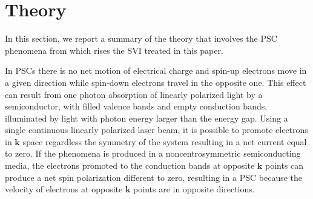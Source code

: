 \documentclass[prb,11pt,tightenlines,twocolumn,aps]{revtex4-1}
\begin{document}
\section{Theory} %
\label{sec:theory}




In this section, we report a summary of the theory that involves the PSC
phenomena from which rises the SVI treated in this paper.
 
In PSCs there is no net motion of electrical charge and spin-up electrons move
in a given direction while spin-down electrons travel in the opposite one.
This effect can result from one photon absorption of linearly polarized light
by a semiconductor, with filled valence bands and empty conduction bands,
illuminated by light with photon energy larger than the energy gap.
Using a single continuous linearly polarized laser beam, it is possible
to promote electrons in $\mathbf{k}$ space regardless the symmetry of the
system resulting in a net current equal to zero. 
% 
If the phenomena is produced in a noncentrosymmetric semiconducting media, the
electrons promoted to the conduction bands at opposite $\mathbf{k}$ points
can produce a net spin polarization different to zero\cite{alvaradoPRL85},
resulting in a PSC because the velocity of electrons
at opposite $\mathbf{k}$ points are in opposite directions.
\end{document}
